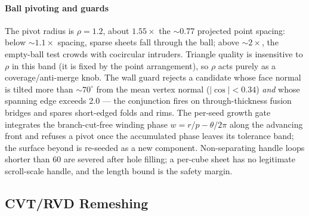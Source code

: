 \paragraph{Ball pivoting and guards} The pivot radius is $\rho = 1.2$, about $1.55\times$ the $\sim$0.77 projected point spacing: below ${\sim}1.1\times$ spacing, sparse sheets fall through the ball; above ${\sim}2\times$, the empty-ball test crowds with cocircular intruders. Triangle quality is insensitive to $\rho$ in this band (it is fixed by the point arrangement), so $\rho$ acts purely as a coverage/anti-merge knob. The wall guard rejects a candidate whose face normal is tilted more than ${\sim}70^\circ$ from the mean vertex normal ($|\cos| < 0.34$) {\em and} whose spanning edge exceeds 2.0 --- the conjunction fires on through-thickness fusion bridges and spares short-edged folds and rims. The per-seed growth gate integrates the branch-cut-free winding phase $w = r/p - \theta/2\pi$ along the advancing front and refuses a pivot once the accumulated phase leaves its tolerance band; the surface beyond is re-seeded as a new component. Non-separating handle loops shorter than 60 are severed after hole filling; a per-cube sheet has no legitimate scroll-scale handle, and the length bound is the safety margin.

\subsection{CVT/RVD Remeshing}
\label{app:cvt}

